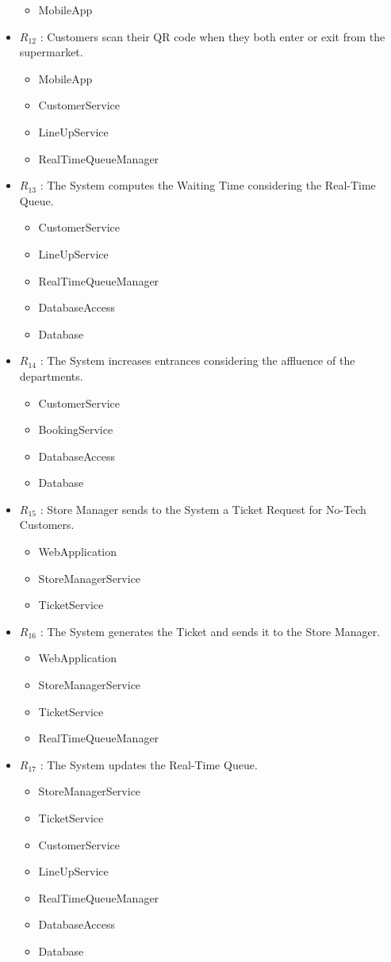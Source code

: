 \begin{itemize}
	\begin{itemize}
	\item MobileApp
	\end{itemize}
	\item $R_{12}$ : Customers scan their QR code when they both enter or exit from the supermarket.
	\begin{itemize}
	\item MobileApp
	\item CustomerService
	\item LineUpService
	\item RealTimeQueueManager
	\end{itemize}
	\item $R_{13}$ : The System computes the Waiting Time considering the Real-Time Queue.
	\begin{itemize}  
	\item CustomerService
	\item LineUpService
	\item RealTimeQueueManager
	\item DatabaseAccess
	\item Database
	\end{itemize}
	\item $R_{14}$ : The System increases entrances considering the affluence of the departments.
	\begin{itemize}  
	\item CustomerService
	\item BookingService
	\item DatabaseAccess
	\item Database
	\end{itemize}
	\item $R_{15}$ : Store Manager sends to the System a Ticket Request for No-Tech Customers.
	\begin{itemize}  
	\item WebApplication
	\item StoreManagerService
	\item TicketService  
	\end{itemize}
	\item $R_{16}$ : The System generates the Ticket and sends it to the Store Manager.
	\begin{itemize}  
	\item WebApplication
	\item StoreManagerService
	\item TicketService
	\item RealTimeQueueManager
	\end{itemize}
	\item $R_{17}$ : The System updates the Real-Time Queue.
	\begin{itemize}   
	\item StoreManagerService
	\item TicketService
	\item CustomerService
	\item LineUpService
	\item RealTimeQueueManager
	\item DatabaseAccess
	\item Database
	\end{itemize}
\end{itemize}